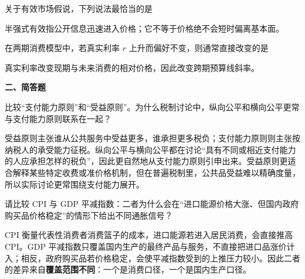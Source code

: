 \begin{question}
关于有效市场假说，下列说法最恰当的是
\begin{choiceoptions}[1]
\end{choiceoptions}
\begin{solution}
半强式有效指公开信息迅速进入价格；它不等于价格绝不会短时偏离基本面。
\end{solution}
\end{question}

\begin{question}
在两期消费模型中，若真实利率 $r$ 上升而偏好不变，则通常直接改变的是
\begin{choiceoptions}[2]
\end{choiceoptions}
\begin{solution}
真实利率改变现期与未来消费的相对价格，因此改变跨期预算线斜率。
\end{solution}
\end{question}

\textbf{二、简答题}

\begin{question}
比较“支付能力原则”和“受益原则”。为什么税制讨论中，纵向公平和横向公平更常与支付能力原则联系在一起？
\begin{solution}
受益原则主张谁从公共服务中受益更多，谁承担更多税负；支付能力原则则主张按纳税人的承受能力征税。纵向公平与横向公平都在讨论“具有不同或相近支付能力的人应承担怎样的税负”，因此更自然地从支付能力原则引申出来。受益原则更适合解释某些特定收费或准价格机制，但在普遍税制里，公共品受益难以精确度量，所以实际讨论更常围绕支付能力展开。\end{solution}
\end{question}

\begin{question}
请比较 CPI 与 GDP 平减指数：二者为什么会在“进口能源价格大涨、但国内政府购买品价格稳定”的情形下给出不同通胀信号？
\begin{solution}
CPI 衡量代表性消费者消费篮子的成本，进口能源若进入居民消费，会直接推高 CPI。GDP 平减指数只覆盖国内生产的最终产品与服务，不直接把进口品涨价计入；相反，政府购买品若价格稳定，会使平减指数受到的上推压力较小。因此二者的差异来自\textbf{覆盖范围不同}：一个是消费口径，一个是国内生产口径。\end{solution}
\end{question}

